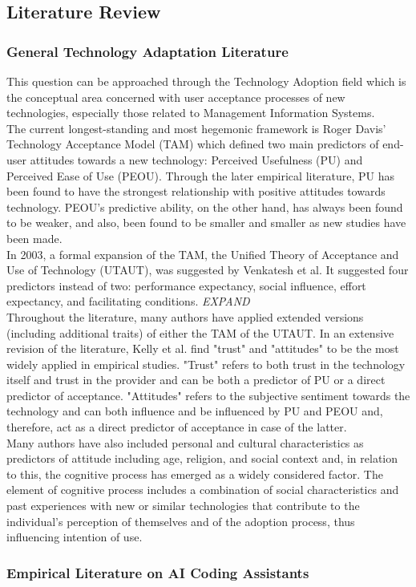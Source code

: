 \subsection{Literature Review}
\subsubsection{General Technology Adaptation Literature}
This question can be approached through the Technology Adoption field which is the conceptual area concerned with user acceptance processes of new technologies, especially those related to Management Information Systems. \\

The current longest-standing and most hegemonic framework is Roger Davis' Technology Acceptance Model (TAM) which defined two main predictors of end-user attitudes towards a new technology: Perceived Usefulness (PU) and Perceived Ease of Use (PEOU). Through the later empirical literature, PU has been found to have the strongest relationship with positive attitudes towards technology. PEOU's predictive ability, on the other hand, has always been found to be weaker, and also, been found to be smaller and smaller as new studies have been made. \\

In 2003, a formal expansion of the TAM, the Unified Theory of Acceptance and Use of Technology (UTAUT), was suggested by Venkatesh et al. It suggested four predictors instead of two: performance expectancy, social influence, effort expectancy, and facilitating conditions. \textit{EXPAND} \\

Throughout the literature, many authors have applied extended versions (including additional traits) of either the TAM of the UTAUT. In an extensive revision of the literature, Kelly et al. find "trust" and "attitudes" to be the most widely applied in empirical studies. "Trust" refers to both trust in the technology itself and trust in the provider and can be both a predictor of PU or a direct predictor of acceptance. "Attitudes" refers to the subjective sentiment towards the technology and can both influence and be influenced by PU and PEOU and, therefore, act as a direct predictor of acceptance in case of the latter. \\

Many authors have also included personal and cultural characteristics as predictors of attitude including age, religion, and social context and, in relation to this, the cognitive process has emerged as a widely considered factor. The element of cognitive process includes a combination of social characteristics and past experiences with new or similar technologies that contribute to the individual's perception of themselves and of the adoption process, thus influencing intention of use. 

\subsubsection{Empirical Literature on AI Coding Assistants}